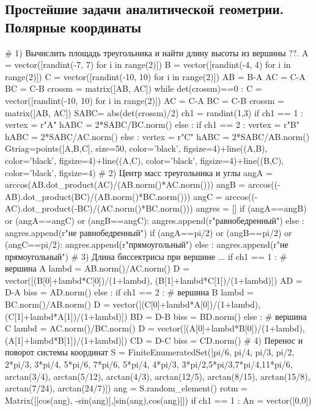 \documentclass[a4paper, 12pt]{article}
\begin{document}
\subsection*{Простейшие задачи аналитической геометрии. \\ Полярные координаты}
\begin{sagesilent}
# 1) Вычислить площадь треугольника и найти длину высоты из вершины ??.
A = vector([randint(-7, 7) for i in range(2)])
B = vector([randint(-4, 4) for i in range(2)])
C = vector([randint(-10, 10) for i in range(2)])
AB = B-A
AC = C-A
BC = C-B
crossm = matrix([AB, AC])
while det(crossm)==0 : 
      C = vector([randint(-10, 10) for i in range(2)])
      AC = C-A
      BC = C-B
      crossm = matrix([AB, AC])
SABC= abs(det(crossm)/2)
ch1 = randint(1,3)
if ch1 == 1 :
   vertex = r"A"
   hABC = 2*SABC/BC.norm()
else :
   if ch1 == 2 :
      vertex = r"B"
      hABC = 2*SABC/AC.norm()      
   else :
      vertex = r"C"
      hABC = 2*SABC/AB.norm() 
Gtriag=points([A,B,C], size=50, color='black', figsize=4)+line((A,B), color='black', figsize=4)+line((A,C), color='black', figsize=4)+line((B,C), color='black', figsize=4)
# 2) Центр масс треугольника и углы
angA = arccos(AB.dot_product(AC)/(AB.norm()*AC.norm())) 
angB = arccos((-AB).dot_product(BC)/(AB.norm()*BC.norm()))
angC = arccos((-AC).dot_product(-BC)/(AC.norm()*BC.norm()))
angres = [] 
if (angA==angB) or (angA==angC) or (angB==angC):
   angres.append(r"равнобедренный")
else :
   angres.append(r"не равнобедренный") 
if (angA==pi/2) or (angB==pi/2) or (angC==pi/2):
   angres.append(r"прямоугольный")
else :
   angres.append(r"не прямоугольный") 
# 3) Длина биссектрисы при вершине ...
if ch1 == 1 : # вершина A
   lambd = AB.norm()/AC.norm()
   D = vector([(B[0]+lambd*C[0])/(1+lambd), (B[1]+lambd*C[1])/(1+lambd)])
   AD = D-A
   biss = AD.norm()
else :
   if ch1 == 2 : # вершина B
      lambd = BC.norm()/AB.norm()
      D = vector([(C[0]+lambd*A[0])/(1+lambd), (C[1]+lambd*A[1])/(1+lambd)])
      BD = D-B
      biss = BD.norm()
   else : # вершина C
      lambd = AC.norm()/BC.norm()
      D = vector([(A[0]+lambd*B[0])/(1+lambd), (A[1]+lambd*B[1])/(1+lambd)])
      CD = D-C
      biss = CD.norm()
# 4) Перенос  и поворот системы координат
S = FiniteEnumeratedSet([pi/6, pi/4, pi/3, pi/2, 2*pi/3, 3*pi/4, 5*pi/6, 7*pi/6, 5*pi/4, 4*pi/3, 3*pi/2,5*pi/3,7*pi/4,11*pi/6, arctan(3/4), arctan(5/12), arctan(4/3), arctan(12/5), arctan(8/15), arctan(15/8), arctan(7/24), arctan(24/7)])
ang = S.random_element()
rotm = Matrix([[cos(ang), -sin(ang)],[sin(ang),cos(ang)]])
if ch1 == 1 :
   An = vector([0,0])

\end{sagesilent}
\end{document}
